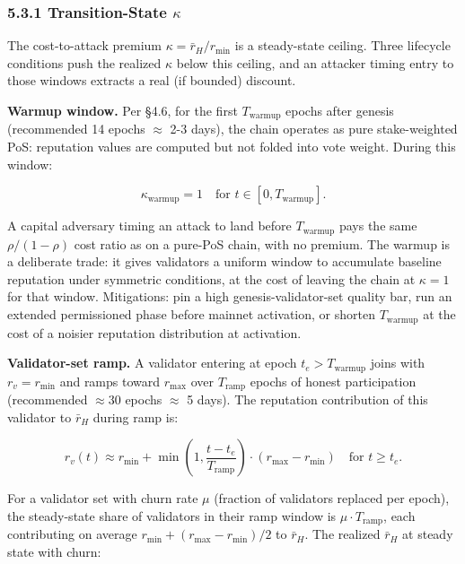 \documentclass[
  11pt,
]{article}
\begin{document}
\subsubsection{\texorpdfstring{5.3.1 Transition-State
\(\kappa\)}{5.3.1 Transition-State \textbackslash kappa}}\label{transition-state-kappa}

The cost-to-attack premium \(\kappa = \bar{r}_H / r_{\min}\) is a
steady-state ceiling. Three lifecycle conditions push the realized
\(\kappa\) below this ceiling, and an attacker timing entry to those
windows extracts a real (if bounded) discount.

\textbf{Warmup window.} Per §4.6, for the first \(T_{\text{warmup}}\)
epochs after genesis (recommended 14 epochs \(\approx\) 2-3 days), the
chain operates as pure stake-weighted PoS: reputation values are
computed but not folded into vote weight. During this window:

\[\kappa_{\text{warmup}} = 1 \quad \text{for } t \in [0, T_{\text{warmup}}].\]

A capital adversary timing an attack to land before
\(T_{\text{warmup}}\) pays the same \(\rho/(1-\rho)\) cost ratio as on a
pure-PoS chain, with no premium. The warmup is a deliberate trade: it
gives validators a uniform window to accumulate baseline reputation
under symmetric conditions, at the cost of leaving the chain at
\(\kappa = 1\) for that window. Mitigations: pin a high
genesis-validator-set quality bar, run an extended permissioned phase
before mainnet activation, or shorten \(T_{\text{warmup}}\) at the cost
of a noisier reputation distribution at activation.

\textbf{Validator-set ramp.} A validator entering at epoch
\(t_e > T_{\text{warmup}}\) joins with \(r_v = r_{\min}\) and ramps
toward \(r_{\max}\) over \(T_{\text{ramp}}\) epochs of honest
participation (recommended \(\approx 30\) epochs \(\approx\) 5 days).
The reputation contribution of this validator to \(\bar{r}_H\) during
ramp is:

\[r_v(t) \approx r_{\min} + \min\!\left(1, \frac{t - t_e}{T_{\text{ramp}}}\right) \cdot (r_{\max} - r_{\min}) \quad \text{for } t \geq t_e.\]

For a validator set with churn rate \(\mu\) (fraction of validators
replaced per epoch), the steady-state share of validators in their ramp
window is \(\mu \cdot T_{\text{ramp}}\), each contributing on average
\(r_{\min} + (r_{\max} - r_{\min})/2\) to \(\bar{r}_H\). The realized
\(\bar{r}_H\) at steady state with churn:
\end{document}
